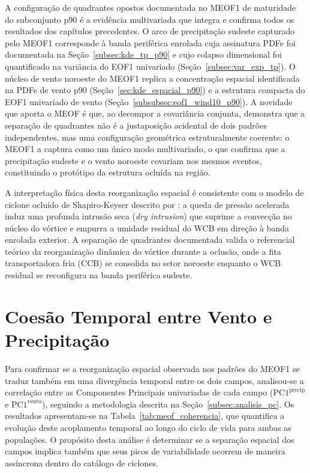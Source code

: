 A configuração de quadrantes opostos documentada no MEOF1 de maturidade do subconjunto p90 é a evidência multivariada que integra e confirma todos os resultados dos capítulos precedentes.
O arco de precipitação sudeste capturado pelo MEOF1 corresponde à banda periférica enrolada cuja assinatura PDFe foi documentada na Seção~\ref{subsec:kde_tp_p90} e cujo colapso dimensional foi quantificado na variância do EOF1 univariado (Seção~\ref{subsec:var_exp_tp}).
O núcleo de vento noroeste do MEOF1 replica a concentração espacial identificada na PDFe de vento p90 (Seção~\ref{sec:kde_espacial_p90}) e a estrutura compacta do EOF1 univariado de vento (Seção~\ref{subsubsec:eof1_wind10_p90}). A novidade que aporta o MEOF é que, ao decompor a covariância conjunta, demonstra que a separação de quadrantes não é a justaposição acidental de dois padrões independentes, mas uma configuração geométrica estruturalmente coerente: o MEOF1 a captura como um único modo multivariado, o que confirma que a precipitação sudeste e o vento noroeste covariam nos mesmos eventos, constituindo o protótipo da estrutura ocluída na região.

A interpretação física desta reorganização espacial é consistente com o modelo de ciclone ocluído de Shapiro-Keyser descrito por \citet{schultz2021antecedents}: a queda de pressão acelerada induz uma profunda intrusão seca (\textit{dry intrusion}) que suprime a convecção no núcleo do vórtice e empurra a umidade residual do WCB em direção à banda enrolada exterior. A separação de quadrantes documentada valida o referencial teórico da reorganização dinâmica do vórtice durante a oclusão, onde a fita transportadora fria (CCB) se consolida no setor noroeste enquanto o WCB residual se reconfigura na banda periférica sudeste.

\section{Coesão Temporal entre Vento e Precipitação}
\label{sec:meof_coherencia}

Para confirmar se a reorganização espacial observada nos padrões do MEOF1 se traduz também em uma divergência temporal entre os dois campos, analisou-se a correlação entre as Componentes Principais univariadas de cada campo ($\text{PC1}^{\text{precip}}$ e $\text{PC1}^{\text{vento}}$), seguindo a metodologia descrita na Seção~\ref{subsec:analisis_pc}. Os resultados apresentam-se na Tabela~\ref{tab:meof_coherencia}, que quantifica a evolução deste acoplamento temporal ao longo do ciclo de vida para ambas as populações. O propósito desta análise é determinar se a separação espacial dos campos implica também que seus picos de variabilidade ocorrem de maneira assíncrona dentro do catálogo de ciclones.

